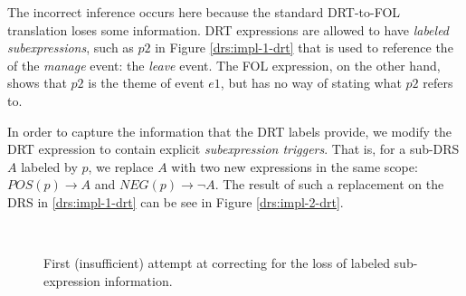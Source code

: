 The incorrect inference occurs here because the standard DRT-to-FOL translation
loses some information.  DRT expressions are allowed to have {\it labeled
subexpressions}, such as $p2$ in Figure \ref{drs:impl-1-drt} that is used to
reference the {\theme} of the {\it manage} event: the {\it leave} event.  The
FOL expression, on the other hand, shows that $p2$ is the theme of event $e1$,
but has no way of stating what $p2$ refers to.

In order to capture the information that the DRT labels provide, we modify the
DRT expression to contain explicit {\it subexpression triggers}.  That is, for a
sub-DRS $A$ labeled by $p$, we replace $A$ with two new expressions in the same
scope: $POS(p) \to A$ and $NEG(p) \to \lnot A$.  The result of such a
replacement on the DRS in \ref{drs:impl-1-drt} can be see in Figure
\ref{drs:impl-2-drt}.   

\begin{figure}
  \centering
  ~~~~~~~~~
  \caption{First (insufficient) attempt at correcting for the loss of labeled
  sub-expression information.}
  \label{drs:impl-2}
\end{figure}

